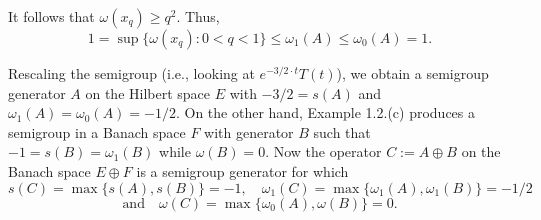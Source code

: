 \begin{example}
\noindent It follows that $\omega(x_q) \geq q^2$. 
Thus,
\[
1 = \sup \{\omega(x_q) : 0 < q < 1\} \leq \omega_1(A) \leq \omega_0(A) = 1.
\]

\noindent Rescaling the semigroup (i.e., looking at $e^{-3/2 \cdot t} T(t)$), we obtain a semigroup generator $A$ on the Hilbert space $E$ with $-3/2 = s(A)$ and $\omega_1(A) = \omega_0(A) = -1/2$. 
On the other hand, Example 1.2.(c) produces a semigroup in a Banach space $F$ with generator $B$ such that $-1 = s(B) = \omega_1(B)$ while $\omega(B) = 0$. 
Now the operator $C := A \oplus B$ on the Banach space $E \oplus F$ is a semigroup generator for which
\[
s(C) = \max \{s(A), s(B)\} = -1, \quad \omega_1(C) = \max\{\omega_1(A), \omega_1(B)\} = -1/2
\]
\[
\text{and} \quad \omega(C) = \max\{\omega_0(A), \omega(B)\} = 0.
\]
\end{example}



